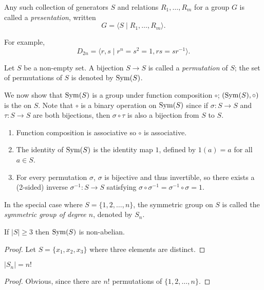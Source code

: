 Any such collection of generators $S$ and relations $R_1,\dots,R_m$ for a group $G$ is called a \emph{presentation}, written
\[G=\langle S\mid R_1,\dots,R_m\rangle.\]

For example,
\[D_{2n}=\langle r,s\mid r^n=s^2=1,rs=sr^{-1}\rangle.\]

\begin{example}
Let $S$ be a non-empty set. A bijection $S\to S$ is called a \emph{permutation} of $S$; the set of permutations of $S$ is denoted by $\operatorname{Sym}(S)$.

We now show that $\operatorname{Sym}(S)$ is a group under function composition $\circ$; $(\operatorname{Sym}(S),\circ)$ is the  on $S$. Note that $\circ$ is a binary operation on $\operatorname{Sym}(S)$ since if $\sigma:S\to S$ and $\tau:S\to S$ are both bijections, then $\sigma\circ\tau$ is also a bijection from $S$ to $S$.
\begin{enumerate}[label=(\roman*)]
\item Function composition is associative so $\circ$ is associative.
\item The identity of $\operatorname{Sym}(S)$ is the identity map $1$, defined by $1(a)=a$ for all $a\in S$.
\item For every permutation $\sigma$, $\sigma$ is bijective and thus invertible, so there exists a (2-sided) inverse $\sigma^{-1}:S\to S$ satisfying $\sigma\circ\sigma^{-1}=\sigma^{-1}\circ\sigma=1$.
\end{enumerate}

In the special case where $S=\{1,2,\dots,n\}$, the symmetric group on $S$ is called the \emph{symmetric group of degree $n$}, denoted by $S_n$.

\begin{proposition*}
If $|S|\ge3$ then $\operatorname{Sym}(S)$ is non-abelian.
\end{proposition*}

\begin{proof}
Let $S=\{x_1,x_2,x_3\}$ where three elements are distinct.
\end{proof}

\begin{proposition*}
$|S_n|=n!$
\end{proposition*}

\begin{proof}
Obvious, since there are $n!$ permutations of $\{1,2,\dots,n\}$.
\end{proof}
\end{example}

